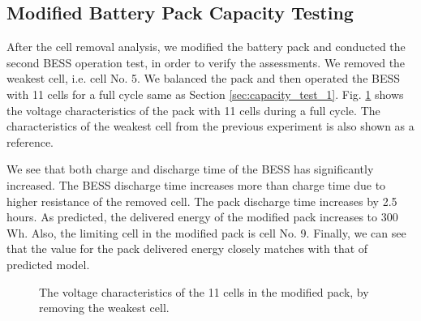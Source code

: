 \documentclass[10pt,twocolumn]{IEEEtran}
\begin{document}
\subsection{Modified  Battery Pack Capacity Testing}
After the cell removal analysis, we modified the  battery pack and  conducted the second BESS operation test, in order to verify the assessments.
We removed the weakest cell, i.e. cell No. 5. 
We balanced the pack and then operated the BESS with 11 cells for a full cycle same as  Section \ref{sec:capacity_test_1}.
Fig.  \ref{fig:cell_removal3} shows the voltage characteristics of the pack with 11 cells during a full cycle.
The characteristics of the weakest cell from the previous experiment is also shown as a reference.

We  see that both charge and discharge time of the BESS has significantly increased. 
The BESS discharge time increases more than  charge time due to higher resistance of the removed cell.
The pack discharge time  increases by 2.5 hours.
As predicted,  the delivered energy of the modified pack increases to 300 Wh.
Also,  the limiting cell in the modified pack is cell No. 9. 
Finally, we can see that the value for the pack delivered energy closely matches with that of predicted model.

\begin{figure}
\centering
\vspace{-0.2cm}
{} \vspace{-0.3cm}
\caption{The voltage characteristics of the 11 cells in the modified pack,  by removing the weakest cell. }
\vspace{-0.3cm}
\label{fig:cell_removal3}
\end{figure} 
\end{document}
